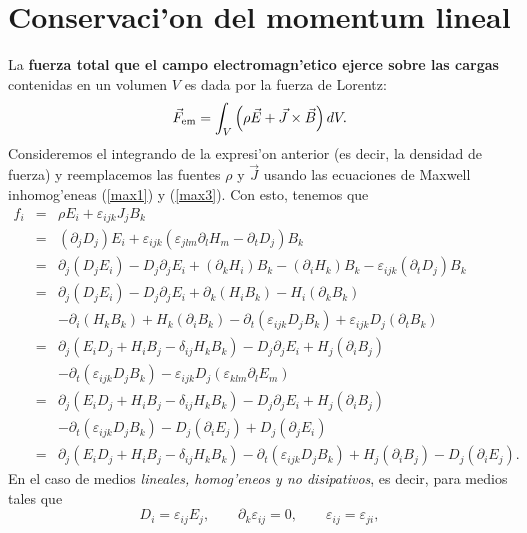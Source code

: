 \section{Conservaci'on del momentum lineal}\label{sec:momentum}
La \textbf{fuerza total que el campo electromagn'etico ejerce sobre las cargas} contenidas en un volumen $V$ es dada por la fuerza de Lorentz:
\begin{equation}
\vec{F}_{\rm em}=\int_V\left(\rho\vec{E}+\vec{J}\times\vec{B}\right)dV .
\end{equation}
Consideremos el integrando de la expresi'on anterior (es decir, la densidad de fuerza) y reemplacemos las fuentes $\rho$ y $\vec{J}$ usando las ecuaciones de Maxwell inhomog'eneas (\ref{max1}) y (\ref{max3}). Con esto, tenemos que
\begin{eqnarray}
f_i&=&\rho E_i+\varepsilon_{ijk}J_jB_k \\
&=&(\partial_jD_j)E_i+\varepsilon_{ijk}(\varepsilon_{
jlm}\partial_lH_m-\partial_tD_j)B_k  \\
&=& \partial_j(D_jE_i)-D_j\partial_jE_i +
(\partial_kH_i)B_k-(\partial_iH_k)B_k-\varepsilon_{ijk}(\partial_tD_j)B_k \\
&=& \partial_j(D_jE_i)-D_j\partial_jE_i +
\partial_k(H_iB_k)-H_i(\partial_kB_k) \nonumber\\
&& -\partial_i(H_kB_k)+H_k(\partial_iB_k)
-\partial_t(\varepsilon_{ijk} D_jB_k)
+\varepsilon_{ijk} D_j(\partial_tB_k) \\
&=&\partial_j(E_iD_j+H_iB_j-\delta_{ij}H_kB_k)
-D_j\partial_jE_i+H_j(\partial_iB_j) \nonumber\\
&& -\partial_t(\varepsilon_{ijk}
D_jB_k)-\varepsilon_{ijk} D_j(\varepsilon_{klm}\partial_lE_m) \\
&=&\partial_j(E_iD_j+H_iB_j-\delta_{ij}H_kB_k)
-D_j\partial_jE_i+H_j(\partial_iB_j) \nonumber\\
&& -\partial_t(\varepsilon_{ijk} D_jB_k)-D_j(\partial_iE_j) +D_j(\partial_jE_i)\\
&=&\partial_j(E_iD_j+H_iB_j-\delta_{ij}H_kB_k)-\partial_t(\varepsilon_{ijk}
D_jB_k)+H_j(\partial_iB_j)- D_j(\partial_iE_j). \label{flc}
\end{eqnarray}
En el caso de medios \textit{lineales, homog'eneos y no disipativos}, es decir, para medios tales que
\begin{equation}
 D_i=\varepsilon_{ij}E_j, \qquad \partial_k\varepsilon_{ij}=0, \qquad \varepsilon_{ij}=\varepsilon_{ji},
\end{equation}
